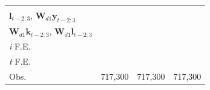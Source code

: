 \begin{tabular}{lccc}
{		} & \makecell[tc]{
			\footnotesize{$\mathbf{y}_{t-2:3}$, $\mathbf{k}_{t-2:3}$} 
			\\
			\footnotesize{$\mathbf{l}_{t-2:3}$, $\mathbf{W}_{d1}\mathbf{y}_{t-2:3}$} 
			\\
			\footnotesize{$\mathbf{W}_{d1}\mathbf{k}_{t-2:3}$, $\mathbf{W}_{d1}\mathbf{l}_{t-2:3}$} 
		}
		\\
		\textit{i} F.E. & \checkmark & \checkmark & \checkmark
		\\
		\textit{t} F.E. & \checkmark & \checkmark & \checkmark
		\\
		Obs. & 717,300 & 717,300 & 717,300
		\\
		\bottomrule
	\end{tabular}